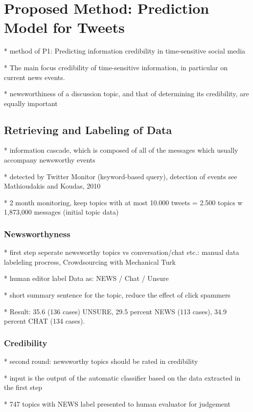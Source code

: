 \documentclass{proseminar}
\begin{document}

\section{Proposed Method: Prediction\\ Model for Tweets}
* method of P1: Predicting information credibility in time-sensitive social media

* The main focus credibility of time-sensitive information, in particular on current news events. 

* newsworthiness of a discussion topic, and that of determining its credibility, are equally important


\subsection{Retrieving and Labeling of Data}
* information cascade, which is composed of all of the messages which usually accompany newsworthy events

* detected by Twitter Monitor (keyword-based query), detection of events see Mathioudakis and Koudas, 2010

* 2 month monitoring, keep topics with at most 10.000 tweets = 2.500 topics w 1,873,000 messages (initial topic data)


\subsubsection*{Newsworthyness}
* first step seperate newsworthy topics vs conversation/chat etc.: manual data labeleling procress, Crowdsourcing with Mechanical Turk

* human editor label Data as: NEWS / Chat / Unsure

* short summary sentence for the topic, reduce the effect of click spammers

* Result: 35.6 (136 cases) UNSURE, 29.5 percent NEWS (113 cases), 34.9 percent CHAT (134 cases).

\subsubsection*{Credibility}
* second round: newsworthy topics should be rated in credibility

* input is the output of the automatic classifier based on the data extracted in the first step

* 747 topics with NEWS label presented to human evaluator for judgement
\end{document}
